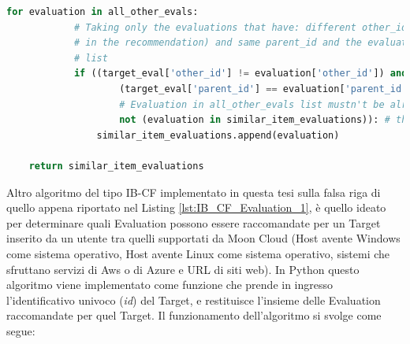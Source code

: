 \begin{itemize}
\begin{lstlisting}[language=Python, label=lst:IB_CF_Evaluation_3]
        for evaluation in all_other_evals:
            # Taking only the evaluations that have: different other_id (excluding the target evaluation
            # in the recommendation) and same parent_id and the evaluations that weren't added to similar_item_evaluations
            # list
            if ((target_eval['other_id'] != evaluation['other_id']) and  # Evaluations must have different 'other_id'
                    (target_eval['parent_id'] == evaluation['parent_id']) and  # Evaluations must have same 'parent_id'
                    # Evaluation in all_other_evals list mustn't be already added to \
                    not (evaluation in similar_item_evaluations)): # the 'similar_item_evaluations' list
                similar_item_evaluations.append(evaluation)
    
    return similar_item_evaluations 
    \end{lstlisting}
\end{itemize}
Altro algoritmo del tipo IB-CF implementato in questa tesi sulla falsa riga di quello appena riportato nel Listing \ref{lst:IB_CF_Evaluation_1}, 
è quello ideato per determinare quali Evaluation possono essere raccomandate per un Target inserito da un utente tra quelli supportati da Moon Cloud
(Host avente Windows come sistema operativo, Host avente Linux come sistema operativo, sistemi che sfruttano 
servizi di Aws o di Azure e URL di siti web).\hfill\break
In Python questo algoritmo viene implementato come funzione che prende in ingresso l'identificativo univoco (\textit{id}) del Target, e 
restituisce l'insieme delle Evaluation raccomandate per quel Target. Il funzionamento dell'algoritmo si svolge come segue:
